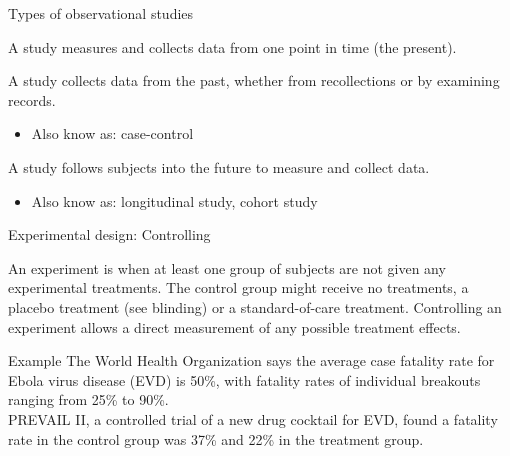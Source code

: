 \documentclass[xcolor=table, aspectratio=169, bigger, handout]{beamer}
\begin{document}
\begin{frame}{Types of observational studies}

\begin{block}{}
A  study measures and collects data from one point in time (the present).
\end{block}
\pause
\begin{block}{}
A  study collects data from the past, whether from recollections or by examining records.
\begin{itemize}
\item Also know as: case-control
\end{itemize}
\end{block}
\pause
\begin{block}{}
A  study follows subjects into the future to measure and collect data.
\begin{itemize}
\item Also know as: longitudinal study, cohort study
\end{itemize}
\end{block}
\end{frame}

\begin{frame}{Experimental design: Controlling}
\begin{block}{}
An experiment is  when at least one group of subjects are not given any experimental treatments. The control group might receive no treatments, a placebo treatment (see blinding) or a standard-of-care treatment. Controlling an experiment allows a direct measurement of any possible treatment effects. 
\end{block}

\begin{exampleblock}{Example}
The World Health Organization says the average case fatality rate for Ebola virus disease (EVD) is 50\%, with fatality rates of individual breakouts ranging from 25\% to 90\%. \\
\medskip
PREVAIL II, a controlled trial of a new drug cocktail for EVD, found a fatality rate in the control group was 37\% and 22\% in the treatment group.
\end{exampleblock}

\end{frame}
\end{document}

